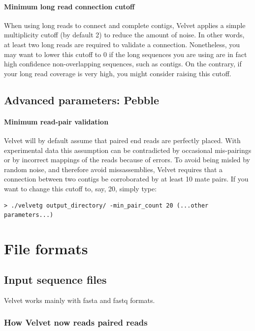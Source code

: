 \documentclass{article}
\begin{document}
\paragraph{Minimum long read connection cutoff}

When using long reads to connect and complete contigs, Velvet applies a simple multiplicity cutoff (by default 2) to reduce the amount of noise. In other words, at least two long reads are required to validate a connection. Nonetheless, you may want to lower this cutoff to 0 if the long sequences you are using are in fact high confidence non-overlapping sequences, such as contigs. On the contrary, if your long read coverage is very high, you might consider raising this cutoff.

\subsection{Advanced parameters: Pebble}

\paragraph{Minimum read-pair validation}

Velvet will by default assume that paired end reads are perfectly placed. With experimental data this assumption can be contradicted by occasional mis-pairings or by incorrect mappings of the reads because of errors. To avoid being misled by random noise, and therefore avoid missassemblies, Velvet requires that a connection between two contigs be corroborated by at least 10 mate pairs. If you want to change this cutoff to, say, 20, simply type:

\begin{verbatim}
> ./velvetg output_directory/ -min_pair_count 20 (...other parameters...)
\end{verbatim}  

\section{File formats}

\subsection{Input sequence files}

\label{sec:pairedformat}

Velvet works mainly with fasta and fastq formats. 

\subsubsection{How Velvet now reads paired reads}
\end{document}
